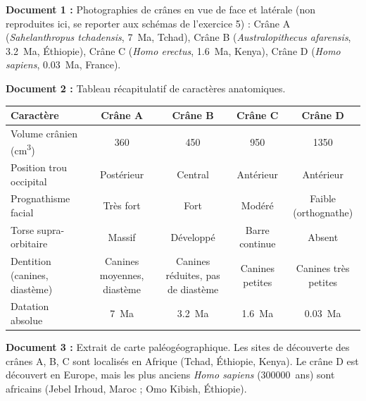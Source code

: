 \documentclass[11pt]{article}
\begin{document}
\begin{exercice}
\textbf{Document 1 :} Photographies de crânes en vue de face et latérale (non reproduites ici, se reporter aux schémas de l'exercice 5) : Crâne A (\emph{Sahelanthropus tchadensis}, \SI{7}{Ma}, Tchad), Crâne B (\emph{Australopithecus afarensis}, \SI{3,2}{Ma}, Éthiopie), Crâne C (\emph{Homo erectus}, \SI{1,6}{Ma}, Kenya), Crâne D (\emph{Homo sapiens}, \SI{0,03}{Ma}, France).

\textbf{Document 2 :} Tableau récapitulatif de caractères anatomiques.
\begin{center}
\begin{tabular}{|l|c|c|c|c|}\hline
\textbf{Caractère} & \textbf{Crâne A} & \textbf{Crâne B} & \textbf{Crâne C} & \textbf{Crâne D} \\ \hline
Volume crânien (\si{cm^3}) & 360 & 450 & 950 & 1350 \\ \hline
Position trou occipital & Postérieur & Central & Antérieur & Antérieur \\ \hline
Prognathisme facial & Très fort & Fort & Modéré & Faible (orthognathe) \\ \hline
Torse supra-orbitaire & Massif & Développé & Barre continue & Absent \\ \hline
Dentition (canines, diastème) & Canines moyennes, diastème & Canines réduites, pas de diastème & Canines petites & Canines très petites \\ \hline
Datation absolue & \SI{7}{Ma} & \SI{3,2}{Ma} & \SI{1,6}{Ma} & \SI{0,03}{Ma} \\ \hline
\end{tabular}
\end{center}

\textbf{Document 3 :} Extrait de carte paléogéographique. Les sites de découverte des crânes A, B, C sont localisés en Afrique (Tchad, Éthiopie, Kenya). Le crâne D est découvert en Europe, mais les plus anciens \emph{Homo sapiens} (\SI{300000}{ans}) sont africains (Jebel Irhoud, Maroc ; Omo Kibish, Éthiopie).


\end{exercice}
\end{document}
